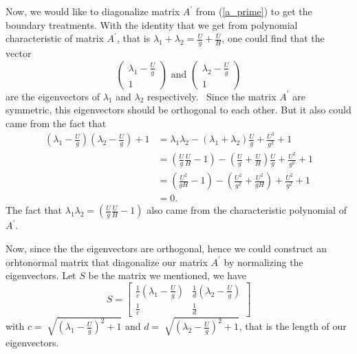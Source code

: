\documentclass{article}
\theoremstyle{definition}
\begin{document}
   Now, we would like to diagonalize matrix $ A^\prime $ from (\ref{a_prime}) to get the boundary treatments. 
   With the identity that we get from polynomial characteristic of matrix $ A^\prime $, 
   that is $\lambda_1 + \lambda_2 =\frac Ug + \frac UH$, one could find that the vector 
   \begin{equation}
        \begin{pmatrix}\lambda_1 - \frac Ug \\ 1 \end{pmatrix} \text{ and } 
        \begin{pmatrix}
            \lambda_2 - \frac Ug \\
            1
        \end{pmatrix}
    \end{equation}
    are the eigenvectors of $\lambda_1$ and $\lambda_2$ respectively. \
    Since the matrix $ A^\prime $ are symmetric, this eigenvectors should 
    be orthogonal to each other. But it also could came from the fact that 
    \begin{align}
        \left(\lambda_1 - \frac Ug\right)\left(\lambda_2 - \frac{U}{g}\right) + 1 
        &= \lambda_1 \lambda_2 - \left(\lambda_1 + \lambda_2\right) \frac{U}{g} + \frac{U^2}{g^2} + 1\\
        &= \left(\frac{U}{g}\frac{U}{H} -1 \right) - \left(\frac{U}{g} + \frac{U}{H}\right) \frac{U}{g}
                + \frac{U^2}{g^2} + 1 \\
        &= \left( \frac{U^2}{gH}  - 1 \right) 
            - \left( \frac{U^2}{g^2} + \frac{U^2}{gH} \right)+ \frac{U^2}{g^2} + 1 \\
        &= 0.
    \end{align}
    The fact that $\lambda_1 \lambda_2 = \left(\frac{U}{g}\frac{U}{H} -1 \right)$ also 
    came from the characteristic polynomial of $A^\prime$. 

    Now, since the the eigenvectors are orthogonal, hence we could construct 
    an orhtonormal matrix that diagonalize our matrix $A^\prime$ by normalizing the eigenvectors.
    Let $S$ be the matrix we mentioned, we have 
    \begin{equation}
        S = \begin{bmatrix}
            \frac 1c \left( \lambda_1 - \frac{U}{g}\right) & \frac 1d \left( \lambda_2 - \frac{U}{g}\right) \\
            \frac 1c & \frac{1}{d}
        \end{bmatrix}
    \end{equation}
    with $c = \sqrt[]{ \left( \lambda_1 - \frac{U}{g}\right)^2 + 1}$ and 
         $d = \sqrt[]{\left( \lambda_2 - \frac{U}{g}\right)^2 + 1}$, that is the length
    of our eigenvectors. 
\end{document}
